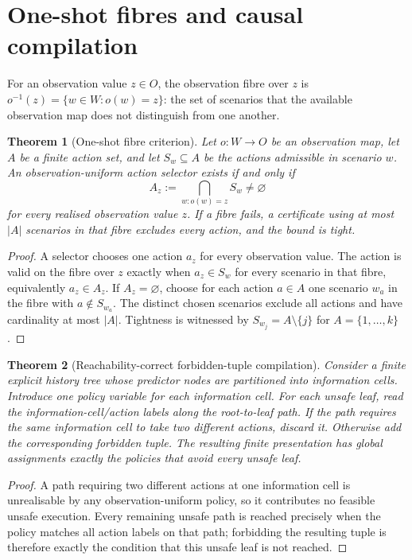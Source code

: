 \documentclass[11pt]{article}
\theoremstyle{plain}
\newtheorem{theorem}{Theorem}[section]
\theoremstyle{definition}
\theoremstyle{remark}
\begin{document}
\section{One-shot fibres and causal compilation}
\label{sec:fibres-compilation}

For an observation value \(z\in O\), the observation fibre over \(z\) is
\(o^{-1}(z)=\{w\in W:o(w)=z\}\): the set of scenarios that the available
observation map does not distinguish from one another.

\begin{theorem}[One-shot fibre criterion]
\label{thm:fibre-criterion}
Let \(o:W\to O\) be an observation map, let \(A\) be a finite action set, and
let \(S_w\subseteq A\) be the actions admissible in scenario \(w\).  An
observation-uniform action selector exists if and only if
\[
  A_z:=\bigcap_{w:o(w)=z}S_w\ne\varnothing
\]
for every realised observation value \(z\).  If a fibre fails, a certificate
using at most \(|A|\) scenarios in that fibre excludes every action, and the
bound is tight.
\end{theorem}

\begin{proof}
A selector chooses one action \(a_z\) for every observation value.  The action is
valid on the fibre over \(z\) exactly when \(a_z\in S_w\) for every scenario in
that fibre, equivalently \(a_z\in A_z\).  If \(A_z=\varnothing\), choose for each
action \(a\in A\) one scenario \(w_a\) in the fibre with \(a\notin S_{w_a}\).
The distinct chosen scenarios exclude all actions and have cardinality at most
\(|A|\).  Tightness is witnessed by \(S_{w_j}=A\setminus\{j\}\) for
\(A=\{1,\ldots,k\}\).
\end{proof}

\begin{theorem}[Reachability-correct forbidden-tuple compilation]
Consider a finite explicit history tree whose predictor nodes are partitioned
into information cells.  Introduce one policy variable for each information
cell.  For each unsafe leaf, read the information-cell/action labels along the
root-to-leaf path.  If the path requires the same information cell to take two
different actions, discard it.  Otherwise add the corresponding forbidden tuple.
The resulting finite presentation has global assignments exactly the policies
that avoid every unsafe leaf.
\end{theorem}

\begin{proof}
A path requiring two different actions at one information cell is unrealisable
by any observation-uniform policy, so it contributes no feasible unsafe
execution.  Every remaining unsafe path is reached precisely when the policy
matches all action labels on that path; forbidding the resulting tuple is
therefore exactly the condition that this unsafe leaf is not reached.
\end{proof}
\end{document}
